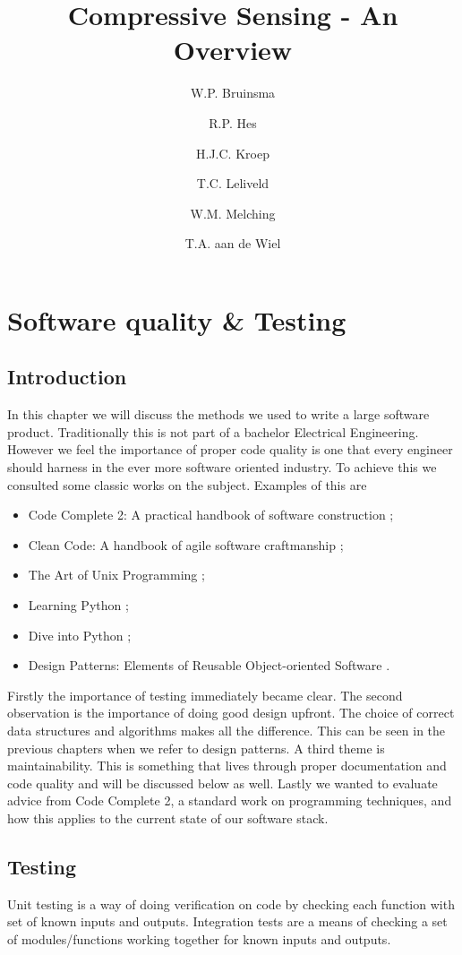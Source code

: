 \documentclass[a4paper, openany, oneside]{memoir}
\title{Compressive Sensing - An Overview}
\author{W.P. Bruinsma \and R.P. Hes \and H.J.C. Kroep \and T.C. Leliveld \and W.M. Melching \and T.A. aan de Wiel}
\begin{document}
\chapter{Software quality \& Testing}
\section{Introduction}
In this chapter we will discuss the methods we used to write a large software product. Traditionally this is not part of a bachelor Electrical Engineering. However we feel the importance of proper code quality is one that every engineer should harness in the ever more software oriented industry. To achieve this we consulted some classic works on the subject. Examples of this are
\begin{itemize}
    \item Code Complete 2: A practical handbook of software construction \cite{mcconnell2004code};
    \item Clean Code: A handbook of agile software craftmanship \cite{martin2008clean};
    \item The Art of Unix Programming \cite{raymond2003art};
    \item Learning Python \cite{lutz2013learning};
    \item Dive into Python \cite{pilgrim2000dive};
    \item Design Patterns: Elements of Reusable Object-oriented Software \cite{designpatterns}.
\end{itemize}
Firstly the importance of testing immediately became clear. The second observation is the importance of doing good design upfront. The choice of correct data structures and algorithms makes all the difference. This can be seen in the previous chapters when we refer to design patterns. A third theme is maintainability. This is something that lives through proper documentation and code quality and will be discussed below as well. Lastly we wanted to evaluate advice from Code Complete 2, a standard work on programming techniques, and how this applies to the current state of our software stack.

\section{Testing}
Unit testing is a way of doing verification on code by checking each function with set of known inputs and outputs. Integration tests are a means of checking a set of modules/functions working together for known inputs and outputs.
\end{document}
